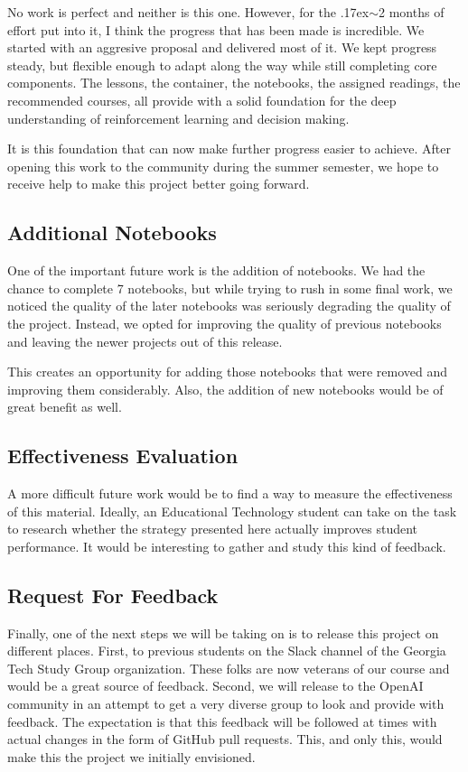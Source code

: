 \documentclass[11pt]{article} %
\begin{document}
No work is perfect and neither is this one. However, for the
{\raise.17ex\hbox{$\scriptstyle\sim$}}2 months of effort
put into it, I think the progress that has been made is incredible. We started
with an aggresive proposal and delivered most of it. We kept progress steady, but
flexible enough to adapt along the way while still completing core components.
The lessons, the container, the notebooks, the assigned readings, the recommended
courses, all provide with a solid foundation for the deep understanding of
reinforcement learning and decision making.

It is this foundation that can now make further progress easier to achieve. After
opening this work to the community during the summer semester, we hope to receive
help to make this project better going forward.

\subsection{Additional Notebooks}

One of the important future work is the addition of notebooks. We had the chance
to complete 7 notebooks, but while trying to rush in some final work, we noticed
the quality of the later notebooks was seriously degrading the quality of the
project. Instead, we opted for improving the quality of previous notebooks and
leaving the newer projects out of this release.

This creates an opportunity for adding those notebooks that were removed and
improving them considerably. Also, the addition of new notebooks would be of
great benefit as well.

\subsection{Effectiveness Evaluation}

A more difficult future work would be to find a way to measure the effectiveness
of this material. Ideally, an Educational Technology student can take on the task
to research whether the strategy presented here actually improves student
performance. It would be interesting to gather and study this kind of feedback.

\subsection{Request For Feedback}

Finally, one of the next steps we will be taking on is to release this project
on different places. First, to previous students on the Slack channel of the
Georgia Tech Study Group organization. These folks are now veterans of our course
and would be a great source of feedback. Second, we will release to the OpenAI
community in an attempt to get a very diverse group to look and provide with
feedback. The expectation is that this feedback will be followed at times with
actual changes in the form of GitHub pull requests. This, and only this, would
make this the project we initially envisioned. 
\end{document}
